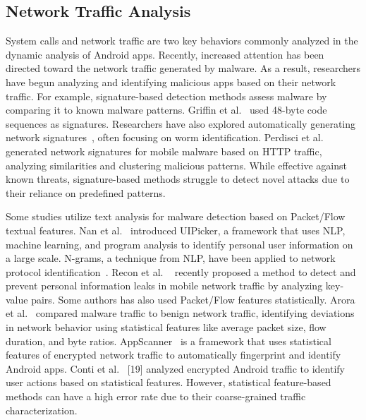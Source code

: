 
\subsection{Network Traffic Analysis}

System calls and network traffic are two key behaviors commonly analyzed in the dynamic analysis of Android apps. Recently, increased attention has been directed toward the network traffic generated by malware. As a result, researchers have begun analyzing and identifying malicious apps based on their network traffic. For example, signature-based detection methods assess malware by comparing it to known malware patterns. Griffin et al.~\cite{Griffin2009}  used 48-byte code sequences as signatures. Researchers have also explored automatically generating network signatures~\cite{PolygraphNewsome2005, Singh2004, Yegneswaran2005}, often focusing on worm identification. Perdisci et al. ~\cite{Perdisci2010} generated network signatures for mobile malware based on HTTP traffic, analyzing similarities and clustering malicious patterns. While effective against known threats, signature-based methods struggle to detect novel attacks due to their reliance on predefined patterns.

Some studies utilize text analysis for malware detection based on Packet/Flow textual features. Nan et al.~\cite{yuhong:usenix-2015} introduced UIPicker, a framework that uses NLP, machine learning, and program analysis to identify personal user information on a large scale. N-grams, a technique from NLP, have been applied to network protocol identification~\cite{YunWang2016}. Recon et al. ~\cite{ren:mobisys-2016} recently proposed a method to detect and prevent personal information leaks in mobile network traffic by analyzing key-value pairs. Some authors has also used Packet/Flow features statistically. Arora et al.~\cite{arora:ngmast-2014} compared malware traffic to benign network traffic, identifying deviations in network behavior using statistical features like average packet size, flow duration, and byte ratios. AppScanner~\cite{taylor:eurosp-2016} is a framework that uses statistical features of encrypted network traffic to automatically fingerprint and identify Android apps. Conti et al.~\cite{Conti2016} [19] analyzed encrypted Android traffic to identify user actions based on statistical features. However, statistical feature-based methods can have a high error rate due to their coarse-grained traffic characterization.

